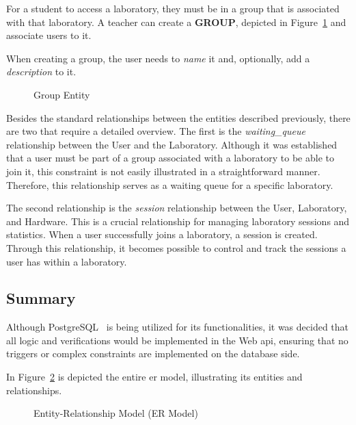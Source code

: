For a student to access a laboratory, they must be in a group that is associated with that laboratory. A teacher can create a \textbf{GROUP}, depicted in Figure~\ref{fig:group_entity} and associate users to it.

When creating a group, the user needs to \textit{name} it and, optionally, add a \textit{description} to it.

\begin{figure}[H]
    \centering
    
    \caption{Group Entity}
    \label{fig:group_entity}
\end{figure}

\vspace{-0,2cm}

Besides the standard relationships between the entities described previously, there are two that require a detailed overview. The first is the \textit{waiting\_queue} relationship between the User and the Laboratory. Although it was established that a user must be part of a group associated with a laboratory to be able to join it, this constraint is not easily illustrated in a straightforward manner. Therefore, this relationship serves as a waiting queue for a specific laboratory.

The second relationship is the \textit{session} relationship between the User, Laboratory, and Hardware. This is a crucial relationship for managing laboratory sessions and statistics. When a user successfully joins a laboratory, a session is created. Through this relationship, it becomes possible to control and track the sessions a user has within a laboratory.

\subsection{Summary}
Although PostgreSQL~\cite{postgresql} is being utilized for its functionalities, it was decided that all logic and verifications would be implemented in the Web \ac{api}, ensuring that no triggers or complex constraints are implemented on the database side.

In Figure~\ref{fig:er_model} is depicted the entire \ac{er model}, illustrating its entities and relationships.

\begin{landscape}
    \begin{figure}
        \centering
        
        \caption{Entity-Relationship Model (ER Model)}
        \label{fig:er_model}
    \end{figure}
\end{landscape}
\let\cleardoublepage\clearpage